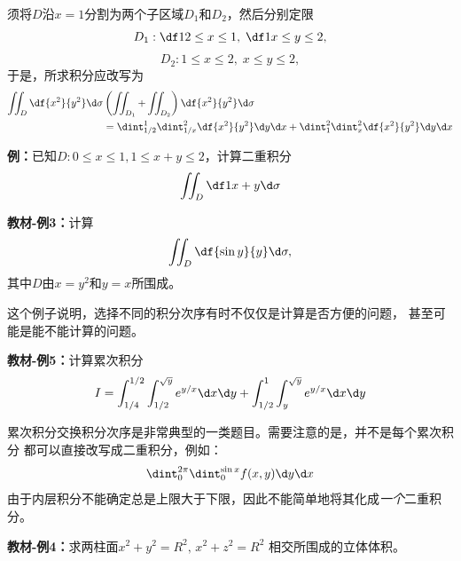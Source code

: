 须将$D$沿$x=1$分割为两个子区域$D_1$和$D_2$，然后分别定限
$$D_1:\df12\leq x\leq 1,\;\df1x\leq y\leq 2,$$
$$D_2:1\leq x\leq 2,\;x\leq y\leq 2,$$
于是，所求积分应改写为
\begin{align*}
	\iint_D\df{x^2}{y^2}\d\sigma&
	\left(\iint_{D_1}+\iint_{D_2}\right)\df{x^2}{y^2}\d\sigma\\
	&=\dint_{1/2}^1\dint_{1/x}^2\df{x^2}{y^2}\d y\d x
	+\dint_1^2\dint_x^2\df{x^2}{y^2}\d y\d x
\end{align*}

{\bf 例：}已知$D:0\leq x\leq 1,1\leq x+y\leq 2$，计算二重积分
$$\iint_D\df1{x+y}\d\sigma$$

{\bf 教材-例3：}计算
$$\iint_D\df{\sin y}{y}\d\sigma,$$
其中$D$由$x=y^2$和$y=x$所围成。

这个例子说明，选择不同的积分次序有时不仅仅是计算是否方便的问题，
甚至可能是能不能计算的问题。

{\bf 教材-例5：}计算累次积分
$$I=\int_{1/4}^{1/2}\int_{1/2}^{\sqrt y}e^{y/x}\d x\d y+
\int_{1/2}^1\int_y^{\sqrt y}e^{y/x}\d x\d y$$

累次积分交换积分次序是非常典型的一类题目。需要注意的是，并不是每个累次积分
都可以直接改写成二重积分，例如：
$$\dint_0^{2\pi}\dint_0^{\sin x}f(x,y)\d y\d x$$
由于内层积分不能确定总是上限大于下限，因此不能简单地将其化成{\it 一个}二重积分。

{\bf 教材-例4：}求两柱面$x^2+y^2=R^2,\, x^2+z^2=R^2$
相交所围成的立体体积。

\begin{center}
\end{center}


